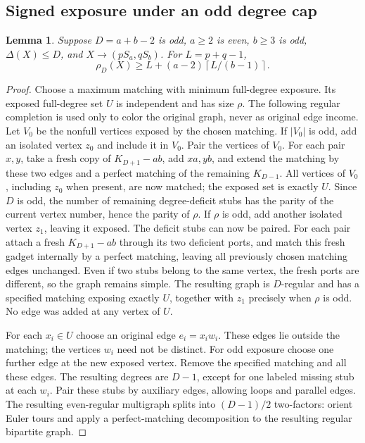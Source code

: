 \documentclass[11pt,a4paper]{article}
\newcommand{\ceil}[1]{\left\lceil#1\right\rceil}
\newtheorem{lemma}[theorem]{Lemma}
\theoremstyle{definition}
\begin{document}
\subsection{Signed exposure under an odd degree cap}
\begin{lemma}\label{lem:signed-exposure}
Suppose $D=a+b-2$ is odd, $a\ge2$ is even, $b\ge3$ is odd, $\Delta(X)\le D$, and $X\to(pS_a,qS_b)$. For $L=p+q-1$,
\[
 \rho_D(X)\ge L+(a-2)\ceil{L/(b-1)}.
\]
\end{lemma}
\begin{proof}
Choose a maximum matching with minimum full-degree exposure. Its exposed full-degree set $U$ is independent and has size $\rho$. The following regular completion is used only to color the original graph, never as original edge income. Let $V_0$ be the nonfull vertices exposed by the chosen matching.
If $|V_0|$ is odd, add an isolated vertex $z_0$ and include it in $V_0$.
Pair the vertices of $V_0$.  For each pair $x,y$, take a fresh copy of
$K_{D+1}-ab$, add $xa,yb$, and extend the matching by these two edges
and a perfect matching of the remaining $K_{D-1}$.
All vertices of $V_0$, including $z_0$ when present, are now matched;
the exposed set is exactly $U$.
Since $D$ is odd, the number of remaining degree-deficit stubs has
the parity of the current vertex number, hence the parity of $\rho$.
If $\rho$ is odd, add another isolated vertex $z_1$, leaving it exposed.
The deficit stubs can now be paired.  For each pair attach a fresh
$K_{D+1}-ab$ through its two deficient ports, and match this fresh
gadget internally by a perfect matching, leaving all previously
chosen matching edges unchanged.  Even if two stubs belong to the
same vertex, the fresh ports are different, so the graph remains simple.
The resulting graph is $D$-regular and has a specified matching
exposing exactly $U$, together with $z_1$ precisely when $\rho$ is odd.
No edge was added at any vertex of $U$.

For each $x_i\in U$ choose an original edge $e_i=x_iw_i$. These edges lie outside the matching; the vertices $w_i$ need not be distinct. For odd exposure choose one further edge at the new exposed vertex. Remove the specified matching and all these edges. The resulting degrees are $D-1$, except for one labeled missing stub at each $w_i$. Pair these stubs by auxiliary edges, allowing loops and parallel edges. The resulting even-regular multigraph splits into $(D-1)/2$ two-factors: orient Euler tours and apply a perfect-matching decomposition to the resulting regular bipartite graph.


\end{proof}
\end{document}
